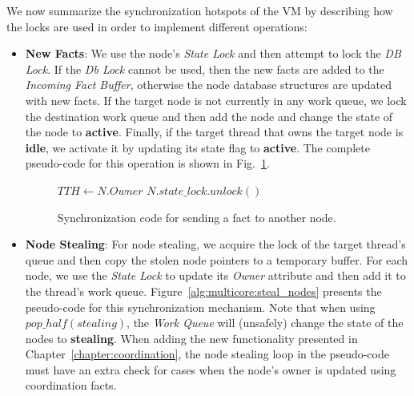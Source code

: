 
We now summarize the synchronization hotspots of the VM by describing how the locks
are used in order to implement different operations:

\begin{itemize}

   \item \textbf{New Facts}: We use the node's \emph{State Lock} and then attempt
      to lock the \emph{DB Lock}. If the \emph{Db Lock} cannot be used, then the
      new facts are added to the \emph{Incoming Fact Buffer}, otherwise the node database
      structures are updated with new facts. If the target node is not currently
      in any work queue, we lock the destination work queue and then add the
      node and change the state of the node to \textbf{active}. Finally, if the
      target thread that owns the target node is \textbf{idle}, we activate it
      by updating its state flag to \textbf{active}. The complete pseudo-code
      for this operation is shown in Fig.~\ref{alg:multicore:new_fact}.

\begin{figure}
\begin{algorithm}[H]
   $TTH \longleftarrow N.Owner$\;
   $N.state\_lock.unlock()$\;
\end{algorithm}
\caption{Synchronization code for sending a fact to another node.}
 \label{alg:multicore:new_fact}
\end{figure}


   \item \textbf{Node Stealing}: For node stealing, we acquire the lock of the
      target thread's queue and then copy the stolen node pointers to a
      temporary buffer. For each node, we use the \emph{State Lock} to update its
      \emph{Owner} attribute and then add it to the thread's work queue.
      Figure~\ref{alg:multicore:steal_nodes} presents the pseudo-code for this
      synchronization mechanism. Note that when using $pop\_half(stealing)$, the
      \emph{Work Queue} will (unsafely) change the state of the nodes to
      \textbf{stealing}. When adding the new functionality presented in
      Chapter~\ref{chapter:coordination}, the node stealing loop in the
      pseudo-code must have an extra check for cases when the node's owner
      is updated using coordination facts.


\end{itemize}
